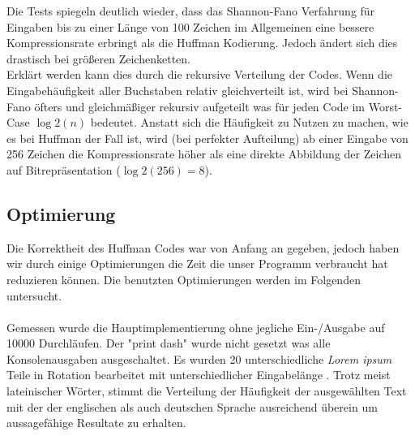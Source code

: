 \documentclass[course=erap]{aspdoc}
\begin{document}
\begin{center}
\end{center}
Die Tests spiegeln deutlich wieder, dass das Shannon-Fano Verfahrung für Eingaben bis zu einer Länge von 100 Zeichen im Allgemeinen eine bessere Kompressionsrate erbringt als die Huffman Kodierung. Jedoch ändert sich dies drastisch bei größeren Zeichenketten.\\
Erklärt werden kann dies durch die rekursive Verteilung der Codes. Wenn die Eingabehäufigkeit aller Buchstaben relativ gleichverteilt ist, wird bei Shannon-Fano öfters und gleichmäßiger rekursiv aufgeteilt was für jeden Code im Worst-Case $\log2(n)$ bedeutet. Anstatt sich die Häufigkeit zu Nutzen zu machen, wie es bei Huffman der Fall ist, wird (bei perfekter Aufteilung) ab einer Eingabe von 256 Zeichen die Kompressionsrate höher als eine direkte Abbildung der Zeichen auf Bitrepräsentation ($\log2(256)=8$).
\subsection{Optimierung}
Die Korrektheit des Huffman Codes war von Anfang an gegeben, jedoch haben wir durch einige Optimierungen die Zeit die unser Programm verbraucht hat reduzieren können. Die benutzten Optimierungen werden im Folgenden untersucht.\\\\
Gemessen wurde die Hauptimplementierung ohne jegliche Ein-/Ausgabe auf 10000 Durchläufen. Der "print dash" wurde nicht gesetzt was alle Konsolenausgaben ausgeschaltet. Es wurden 20 unterschiedliche \textit{Lorem ipsum} Teile %
in Rotation bearbeitet mit unterschiedlicher Eingabelänge . Trotz meist lateinischer Wörter, stimmt die Verteilung der Häufigkeit der ausgewählten Text mit der der englischen als auch deutschen Sprache ausreichend überein um aussagefähige Resultate zu erhalten.
\end{document}

